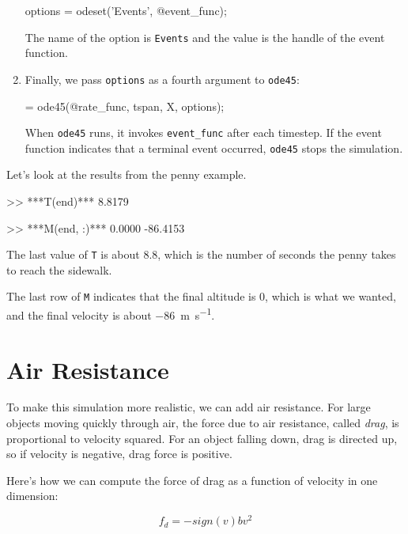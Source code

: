 \begin{enumerate}
\begin{code}
options = odeset('Events', @event_func);
\end{code}
%
The name of the option is {\tt Events} and the value is the handle of the event function.  

\item Finally, we pass {\tt options} as a fourth argument to {\tt ode45}:

\begin{code}
[T, M] = ode45(@rate_func, tspan, X, options);
\end{code}

When {\tt ode45} runs, it invokes \verb"event_func" after each timestep.  If the event function indicates that a terminal event occurred, 
{\tt ode45} stops the simulation.

\end{enumerate}

Let's look at the results from the penny example.  

\begin{code}
>> ***T(end)***
8.8179

>> ***M(end, :)***
0.0000  -86.4153
\end{code}

The last value of {\tt T} is about 8.8, which is the number of seconds the penny takes to reach the sidewalk.

The last row of {\tt M} indicates that the final altitude is 0, which is what we wanted, and the final velocity is about \SI{-86}{\meter \per \second}.


\section{Air Resistance}
\label{air_resistance}


To make this simulation more realistic, we can add air resistance.
For large objects moving quickly through air, the force due to air resistance, called \emph{drag}, is proportional to velocity squared.  
For an object falling down, drag is
directed up, so if velocity is negative, drag force is positive.


Here's how we can compute the force of drag as a function of velocity in one dimension:

\begin{equation}
    f_d = -sign(v) b v^2 
\end{equation}

